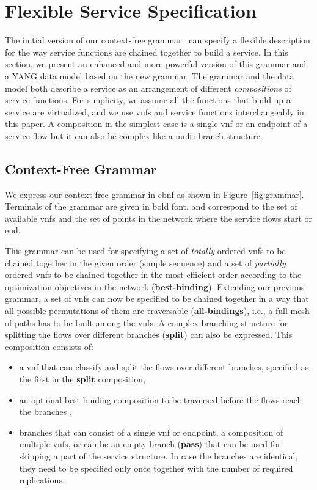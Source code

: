 \documentclass{sig-alternate-per}
\begin{document}
\section{Flexible Service Specification}
\label{sec:specification}

The initial version of our context-free grammar~\cite{mehraghdam2014specifying} can specify a 
flexible description for the way service functions are 
chained together to build a service. In this section, we present an enhanced and 
more powerful version of this grammar and a YANG data model based on the new grammar. 
The grammar and the data model both describe a service as an arrangement of different
\emph{compositions} of service functions. For simplicity, we assume all the 
functions that build up a service are virtualized, and we use \acp{vnf} and service
functions interchangeably in this paper. A composition in the simplest case is a single
\ac{vnf} or an endpoint of a service flow but it can also be complex like a multi-branch
structure.


\subsection{Context-Free Grammar}
\label{subsec:grammar}

We express our context-free grammar in \ac{ebnf} as shown in Figure~\ref{fig:grammar}.
Terminals of the grammar are given in bold font. 
and  correspond to the set of available \acp{vnf}
and the set of points in the network where the service flows
start or end.





This grammar can be used for specifying a set of
\emph{totally} ordered \acp{vnf} to be chained together in the given order (simple sequence) and
a set of \emph{partially} ordered \acp{vnf} to be chained together in the most
efficient order according to the optimization objectives in the network (\textbf{best-binding}).
Extending our previous grammar, a set of \acp{vnf} can now be specified to be
chained together in a way that all possible 
permutations of them are traversable (\textbf{all-bindings}), i.e., a full mesh of
paths has to be built among the \acp{vnf}.
A complex branching structure for splitting the flows over different 
branches (\textbf{split}) can also be expressed. This composition consists of:
\begin{itemize}[noitemsep]
 \item a \ac{vnf} that can classify and split the flows over different branches,
 specified as the first  in the \textbf{split} composition,
 \item an optional best-binding composition to be traversed before the flows 
 reach the branches \cite{mehraghdam2014specifying},
 \item branches that can consist of a single \ac{vnf} or endpoint, a composition 
 of multiple \acp{vnf}, or can be an empty branch (\textbf{pass}) that can be used for
 skipping a part of the service structure. In case the branches are identical, 
 they need to be specified only once together with the number of required replications. 
\end{itemize}
\end{document}
